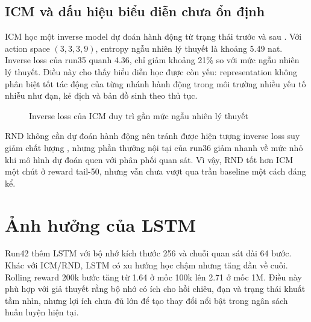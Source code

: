 \subsection{ICM và dấu hiệu biểu diễn chưa ổn định}

ICM học một inverse model dự đoán hành động từ trạng thái trước và sau \cite{Pathak2017}. Với action space $(3,3,3,9)$, entropy ngẫu nhiên lý thuyết là khoảng 5.49 nat. Inverse loss của run35 quanh 4.36, chỉ giảm khoảng 21\% so với mức ngẫu nhiên lý thuyết. Điều này cho thấy biểu diễn học được còn yếu: representation không phân biệt tốt tác động của từng nhánh hành động trong môi trường nhiều yếu tố nhiễu như đạn, kẻ địch và bản đồ sinh theo thủ tục.

\begin{figure}[H]
    \centering
    \caption{Inverse loss của ICM duy trì gần mức ngẫu nhiên lý thuyết}
    \label{fig:icm_inverse_plateau}
\end{figure}

RND không cần dự đoán hành động nên tránh được hiện tượng inverse loss suy giảm chất lượng \cite{Burda2018}, nhưng phần thưởng nội tại của run36 giảm nhanh về mức nhỏ khi mô hình dự đoán quen với phân phối quan sát. Vì vậy, RND tốt hơn ICM một chút ở reward tail-50, nhưng vẫn chưa vượt qua trần baseline một cách đáng kể.

\section{Ảnh hưởng của LSTM}

Run42 thêm LSTM với bộ nhớ kích thước 256 và chuỗi quan sát dài 64 bước. Khác với ICM/RND, LSTM có xu hướng học chậm nhưng tăng dần về cuối. Rolling reward 200k bước tăng từ 1.64 ở mốc 100k lên 2.71 ở mốc 1M. Điều này phù hợp với giả thuyết rằng bộ nhớ có ích cho hồi chiêu, đạn và trạng thái khuất tầm nhìn, nhưng lợi ích chưa đủ lớn để tạo thay đổi nổi bật trong ngân sách huấn luyện hiện tại.

